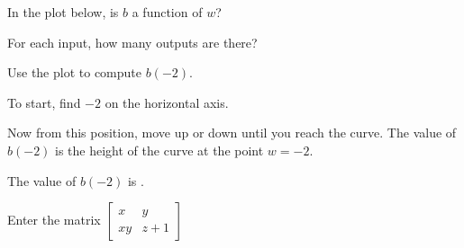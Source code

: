 \documentclass{ximera}
\begin{document}
\begin{shuffle}
\begin{question}
In the plot below, is $b$ a function of $w$?
\begin{image}
\end{image}
\begin{multipleChoice}
\end{multipleChoice}
\begin{hint}
For each input, how many outputs are there?
\end{hint}
Use the plot to compute $b(-2)$.
\begin{hint}
To start, find $-2$ on the horizontal axis. 
\end{hint}
\begin{hint}
Now from this position, move up or down until you reach the curve. The value of $b(-2)$ is the height of the curve at the point $w=-2$.
\end{hint}
The value of $b(-2)$ is .
\end{question}
\end{shuffle}

\begin{question}
Enter the matrix  \(\begin{bmatrix} x & y \\ xy & z+1 \end{bmatrix}\)
\end{question}
\end{document}
